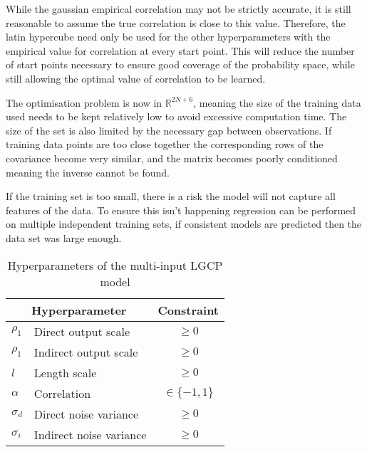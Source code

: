 \documentclass[a4paper,11pt]{report}
\begin{document}
While the gaussian empirical correlation may not be strictly accurate, it is still reasonable to assume the true correlation is close to this value. Therefore, the latin hypercube need only be used for the other hyperparameters with the empirical value for correlation at every start point. This will reduce the number of start points necessary to ensure good coverage of the probability space, while still allowing the optimal value of correlation to be learned.


The optimisation problem is now in \(\mathds{R}^{2N+6}\), meaning the size of the training data used needs to be kept relatively low to avoid excessive computation time. The size of the set is also limited by the necessary gap between observations. If training data points are too close together the corresponding rows of the covariance become very similar, and the matrix becomes poorly conditioned meaning the inverse cannot be found. \par

If the training set is too small, there is a risk the model will not capture all features of the data. To ensure this isn't happening regression can be performed on multiple independent training sets, if consistent models are predicted then the data set was large enough.


\begin{table}[]
\centering
\caption{Hyperparameters of the multi-input LGCP model}
\label{LGCPChyperparameters}
\begin{tabular}{ll|c}
\multicolumn{2}{c|}{\textbf{Hyperparameter}} & \textbf{Constraint} \\ \hline
\(\rho_1\)           & Direct output scale             & \(\geq0\)            \\
\(\rho_1\)             & Indirect output scale           & \(\geq0\)            \\
\(l\)          & Length scale                    & \(\geq0\)            \\
\(\alpha\)             & Correlation                     &  \(\in\{-1,1\}\)                   \\
\(\sigma_d\)             & Direct noise variance           &    \(\geq0\)                 \\
\(\sigma_i\)           & Indirect noise variance         &     \(\geq0\)               
\end{tabular}
\end{table}
\end{document}
